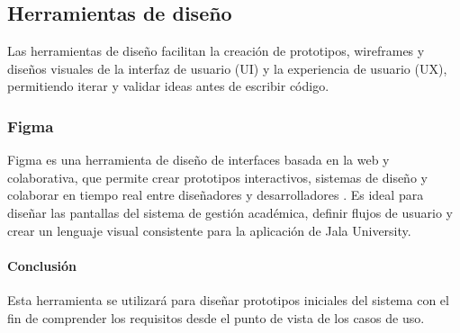 \subsection{Herramientas de diseño}
Las herramientas de diseño facilitan la creación de prototipos, wireframes y diseños visuales de la interfaz de usuario (UI) y la experiencia de usuario (UX), permitiendo iterar y validar ideas antes de escribir código.

\subsubsection{Figma}
Figma es una herramienta de diseño de interfaces basada en la web y colaborativa, que permite crear prototipos interactivos, sistemas de diseño y colaborar en tiempo real entre diseñadores y desarrolladores \parencite{Figma}.
Es ideal para diseñar las pantallas del sistema de gestión académica, definir flujos de usuario y crear un lenguaje visual consistente para la aplicación de Jala University.

\paragraph{Conclusión}
Esta herramienta se utilizará para diseñar prototipos iniciales del sistema con el fin de comprender los requisitos desde el punto de vista de los casos de uso.
